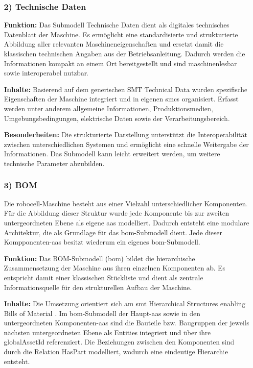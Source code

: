 \subsubsection*{2) Technische Daten}
\vspace{-0.5em}
\textbf{Funktion:}  
Das Submodell Technische Daten dient als digitales technisches Datenblatt der Maschine.
Es ermöglicht eine standardisierte und strukturierte Abbildung aller relevanten Maschineneigenschaften und ersetzt damit die klassischen technischen Angaben aus der Betriebsanleitung.
Dadurch werden die Informationen kompakt an einem Ort bereitgestellt und sind maschinenlesbar sowie interoperabel nutzbar.

\textbf{Inhalte:}  
Basierend auf dem generischen SMT Technical Data \cite{SpezifikaitonTechnischeDaten} wurden spezifische Eigenschaften der Maschine integriert 
und in eigenen \acsp{smc} organisiert. 
Erfasst werden unter anderem allgemeine Informationen, Produktionsmedien, Umgebungsbedingungen, elektrische Daten 
sowie der Verarbeitungsbereich.

\textbf{Besonderheiten:}  
Die strukturierte Darstellung unterstützt die Interoperabilität zwischen unterschiedlichen Systemen und ermöglicht eine schnelle Weitergabe der Informationen. 
Das Submodell kann leicht erweitert werden, um weitere technische Parameter abzubilden.

\subsubsection*{3) BOM}
\vspace{-0.5em}
Die robocell-Maschine besteht aus einer Vielzahl unterschiedlicher Komponenten.  
Für die Abbildung dieser Struktur wurde jede Komponente bis zur zweiten untergeordneten Ebene als eigene \acs{aas} modelliert.  
Dadurch entsteht eine modulare Architektur, die als Grundlage für das \acs{bom}-Submodell dient.  
Jede dieser Kompponenten-\acs{aas} besitzt wiederum ein eigenes \acs{bom}-Submodell.

\textbf{Funktion:}  
Das BOM-Submodell (\acs{bom}) bildet die hierarchische Zusammensetzung der Maschine aus ihren einzelnen Komponenten ab.  
Es entspricht damit einer klassischen Stückliste und dient als zentrale Informationsquelle für den strukturellen Aufbau der Maschine.

\textbf{Inhalte:}  
Die Umsetzung orientiert sich am \acs{smt} Hierarchical Structures enabling Bills of Material \cite{SpezifikationHierachischeStrukturen}.  
Im \acs{bom}-Submodell der Haupt-\acs{aas} sowie in den untergeordneten Komponenten-\acs{aas} sind die Bauteile bzw. Baugruppen der jeweils nächsten untergeordneten Ebene als Entities integriert und über ihre globalAssetId referenziert.  
Die Beziehungen zwischen den Komponenten sind durch die Relation HasPart modelliert, wodurch eine eindeutige Hierarchie entsteht.

